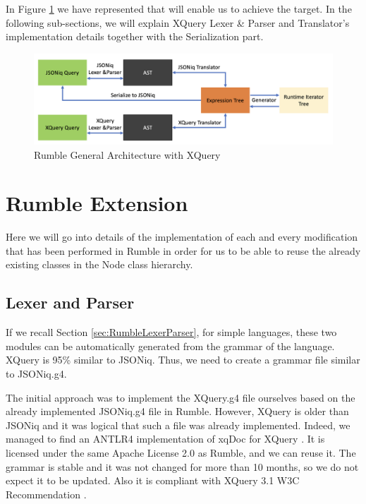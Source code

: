 In Figure \ref{fig:Rumble_General_Architecture_With_XQuery} we have represented that will enable us to achieve the target. In the following sub-sections, we will explain XQuery Lexer \& Parser and Translator's implementation details together with the Serialization part. 

\begin{figure}[h!]
	\includegraphics[width=\linewidth]{double_parsing_architecture.png}
	\vspace*{-5mm}
	\caption{Rumble General Architecture with XQuery}
	\label{fig:Rumble_General_Architecture_With_XQuery}
\end{figure}

\section{Rumble Extension}
Here we will go into details of the implementation of each and every modification that has been performed in Rumble in order for us to be able to reuse the already existing classes in the Node class hierarchy. 

\subsection{Lexer and Parser}
If we recall Section \ref{sec:RumbleLexerParser}, for simple languages, these two modules can be automatically generated from the grammar of the language. XQuery is 95\% similar to JSONiq. Thus, we need to create a grammar file similar to JSONiq.g4. 

The initial approach was to implement the XQuery.g4 file ourselves based on the already implemented JSONiq.g4 file in Rumble. However, XQuery is older than JSONiq and it was logical that such a file was already implemented. Indeed, we managed to find an ANTLR4 implementation of xqDoc for XQuery \cite{XqueryGrammar}. It is licensed under the same Apache License 2.0 as Rumble, and we can reuse it. The grammar is stable and it was not changed for more than 10 months, so we do not expect it to be updated. Also it is compliant with XQuery 3.1 W3C Recommendation \cite{XQueryRecommendation}. 

